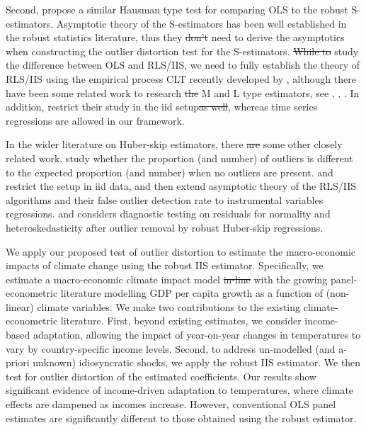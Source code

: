 \documentclass[11pt, letterpaper]{article}
\numberwithin{algorithm}{section}
\numberwithin{assumption}{section}
\numberwithin{lemma}{section}
\numberwithin{theorem}{section}
\numberwithin{corollary}{section}
\numberwithin{remark}{section}
\numberwithin{equation}{section}
\numberwithin{figure}{section}
\numberwithin{table}{section}
\providecommand{\DIFadd}[1]{{\protect\color{blue}\uwave{#1}}} %
\providecommand{\DIFdel}[1]{{\protect\color{red}\sout{#1}}}                      %
\providecommand{\DIFaddbegin}{} %
\providecommand{\DIFaddend}{} %
\providecommand{\DIFdelbegin}{} %
\providecommand{\DIFdelend}{} %
\newcommand{\DIFscaledelfig}{0.5}
\newlength{\DIFdelgraphicswidth} %
\newlength{\DIFdelgraphicsheight} %
\newcommand{\DIFaddincludegraphics}[2][]{{\color{blue}\fbox{\DIFOincludegraphics[#1]{#2}}}} %
\newcommand{\DIFdelincludegraphics}[2][]{%
\sbox{\DIFdelgraphicsbox}{\DIFOincludegraphics[#1]{#2}}%
\settoboxwidth{\DIFdelgraphicswidth}{\DIFdelgraphicsbox} %
\settoboxtotalheight{\DIFdelgraphicsheight}{\DIFdelgraphicsbox} %
\scalebox{\DIFscaledelfig}{%
\parbox[b]{\DIFdelgraphicswidth}{\usebox{\DIFdelgraphicsbox}\\[-\baselineskip] \rule{\DIFdelgraphicswidth}{0em}}\llap{\resizebox{\DIFdelgraphicswidth}{\DIFdelgraphicsheight}{%
\setlength{\unitlength}{\DIFdelgraphicswidth}%
\begin{picture}(1,1)%
\thicklines\linethickness{2pt} %
{\color[rgb]{1,0,0}\put(0,0){\framebox(1,1){}}}%
{\color[rgb]{1,0,0}\put(0,0){\line( 1,1){1}}}%
{\color[rgb]{1,0,0}\put(0,1){\line(1,-1){1}}}%
\end{picture}%
}\hspace*{3pt}}} %
} %
\DeclareRobustCommand{\DIFaddbegin}{\DIFOaddbegin \let\includegraphics\DIFaddincludegraphics} %
\DeclareRobustCommand{\DIFaddend}{\DIFOaddend \let\includegraphics\DIFOincludegraphics} %
\DeclareRobustCommand{\DIFdelbegin}{\DIFOdelbegin \let\includegraphics\DIFdelincludegraphics} %
\DeclareRobustCommand{\DIFdelend}{\DIFOaddend \let\includegraphics\DIFOincludegraphics} %
\begin{document}
Second, \cite{dehon2012extending} propose a similar Hausman type test for comparing OLS to the robust S-estimators. Asymptotic theory of the S-estimators has been well established in the robust statistics literature, thus they \DIFdelbegin \DIFdel{don't }\DIFdelend \DIFaddbegin \DIFadd{do not }\DIFaddend need to derive the asymptotics when constructing the outlier distortion test for the S-estimators. \DIFdelbegin \DIFdel{While to }\DIFdelend \DIFaddbegin \DIFadd{To }\DIFaddend study the difference between OLS and RLS/IIS, we need to fully establish the theory of RLS/IIS using the empirical process CLT recently developed by \cite{berenguer2019analysis}, although there have been some related work to research \DIFdelbegin \DIFdel{the }\DIFdelend M and L type estimators, see \cite{hendry2008automatic}, \cite{johansen2009analysis, johansen2013outlier, johansen2016analysis, johansen2016asymptotic, johansen2019boundedness}, \cite{jiao2015asymptotic}. In addition, \cite{dehon2012extending} restrict their study in the iid setup\DIFdelbegin \DIFdel{as well}\DIFdelend , whereas time series regressions are allowed in our framework.

In the wider literature on Huber-skip estimators, there \DIFdelbegin \DIFdel{are }\DIFdelend \DIFaddbegin \DIFadd{is }\DIFaddend some other closely related work. \cite{jiao2020testingoutlier} study whether the proportion (and number) of outliers is different to the expected proportion (and number) when no outliers are present. \cite{jiao2019robustIV} and \cite{jiao2021asymptoitcFODR2SLS} restrict the setup in iid data, and then extend asymptotic theory of the RLS/IIS algorithms and their false outlier detection rate to instrumental variables regressions. \cite{berenguer2018marked} and \cite{berenguer2021heteroscedasticity} considers diagnostic testing on residuals for normality and heteroskedasticity after outlier removal by robust Huber-skip regressions.

We apply our proposed test of outlier distortion to estimate the macro-economic impacts of climate change using the robust IIS estimator. Specifically, we estimate a macro-economic climate impact model \DIFdelbegin \DIFdel{in-line }\DIFdelend \DIFaddbegin \DIFadd{in line }\DIFaddend with the growing panel-econometric literature modelling GDP per capita growth as a function of (non-linear) climate variables. We make two contributions to the existing climate-econometric literature. First, beyond existing estimates, we consider income-based adaptation, allowing the impact of year-on-year changes in temperatures to vary by country-specific income levels. Second, to address un-modelled (and a-priori unknown) idiosyncratic shocks, we apply the robust IIS estimator. We then test for outlier distortion of the estimated coefficients. Our results show significant evidence of income-driven adaptation to temperatures, where climate effects are dampened as incomes increase. However, conventional OLS panel estimates are significantly different to those obtained using the robust estimator.
\DIFaddbegin
\end{document}
